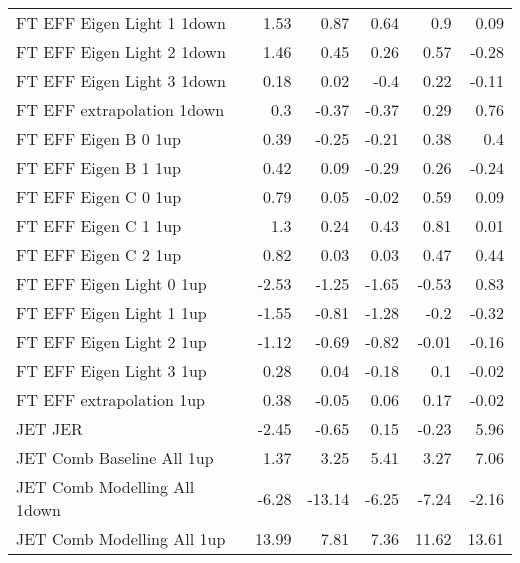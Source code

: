 \begin{table}[htbp]
{\begin{tabular}{lrrrrr}
FT EFF Eigen Light 1  1down                     & 1.53              & 0.87   & 0.64  & 0.9   & 0.09   \\
FT EFF Eigen Light 2  1down                     & 1.46              & 0.45   & 0.26  & 0.57  & -0.28  \\
FT EFF Eigen Light 3  1down                     & 0.18              & 0.02   & -0.4  & 0.22  & -0.11  \\
FT EFF extrapolation  1down                       & 0.3               & -0.37  & -0.37 & 0.29  & 0.76   \\
FT EFF Eigen B 0  1up                           & 0.39              & -0.25  & -0.21 & 0.38  & 0.4    \\
FT EFF Eigen B 1  1up                           & 0.42              & 0.09   & -0.29 & 0.26  & -0.24  \\
FT EFF Eigen C 0  1up                           & 0.79              & 0.05   & -0.02 & 0.59  & 0.09   \\
FT EFF Eigen C 1  1up                           & 1.3               & 0.24   & 0.43  & 0.81  & 0.01   \\
FT EFF Eigen C 2  1up                           & 0.82              & 0.03   & 0.03  & 0.47  & 0.44   \\
FT EFF Eigen Light 0  1up                       & -2.53             & -1.25  & -1.65 & -0.53 & 0.83   \\
FT EFF Eigen Light 1  1up                       & -1.55             & -0.81  & -1.28 & -0.2  & -0.32  \\
FT EFF Eigen Light 2  1up                       & -1.12             & -0.69  & -0.82 & -0.01 & -0.16  \\
FT EFF Eigen Light 3  1up                       & 0.28              & 0.04   & -0.18 & 0.1   & -0.02  \\
FT EFF extrapolation  1up                         & 0.38              & -0.05  & 0.06  & 0.17  & -0.02  \\
JET JER                                              & -2.45             & -0.65  & 0.15  & -0.23 & 5.96   \\
JET Comb Baseline All  1up                       & 1.37              & 3.25   & 5.41  & 3.27  & 7.06   \\
JET Comb Modelling All  1down                    & -6.28             & -13.14 & -6.25 & -7.24 & -2.16  \\
JET Comb Modelling All  1up                      & 13.99             & 7.81   & 7.36  & 11.62 & 13.61  \\

\end{tabular}}
\end{table}
